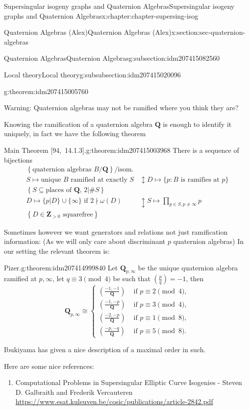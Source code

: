 \documentclass[oneside,10pt,]{book}
\numberwithin{equation}{section}
\newcommand{\legendre}[2]{\left(\frac{#1}{#2}\right)}
\newcommand{\ZZ}{\mathbf{Z}}
\newcommand{\QQ}{\mathbf{Q}}
\newcommand{\gt}{>}
\newcommand{\amp}{&}
\begin{document}
\begin{chapterptx}{Supersingular isogeny graphs and Quaternion Algebras}{}{Supersingular isogeny graphs and Quaternion Algebras}{}{}{x:chapter:chapter-supersing-isog}
\begin{sectionptx}{Quaternion Algebras (Alex)}{}{Quaternion Algebras (Alex)}{}{}{x:section:sec-quaternion-algebras}
\begin{subsectionptx}{Quaternion Algebras}{}{Quaternion Algebras}{}{}{g:subsection:idm207415082560}
\begin{subsubsectionptx}{Local theory}{}{Local theory}{}{}{g:subsubsection:idm207415020096}
\begin{theorem}{}{}{g:theorem:idm207415005760}
\end{theorem}
Warning: Quaternion algebras may not be ramified where you think they are?%
\par
Knowing the ramification of a quaternion algebra \(\QQ\) is enough to identify it uniquely, in fact we have the following theorem%
\begin{theorem}{Main Theorem [94,~14.1.3].}{}{g:theorem:idm207415003968}%
There is a sequence of bijections%
\begin{align*}
\left\{ \text{quaternion algebras }B/\QQ \right\}/\text{isom.}\\
S \mapsto \text{unique }B \text{ ramified at exactly }S\amp\updownarrow D\mapsto \{p : B \text{ is ramifies at } p\}\\
\left\{ S \subseteq \text{places of }\QQ,\,2|\#S \right\}\\
D \mapsto \{p|D\} \cup \{\infty\} \text{ if }2\nmid \omega(D)\amp\updownarrow S \mapsto \prod_{p\in S,p\ne \infty} p\\
\left\{ D\in \ZZ_{\gt 0 }\text{ squarefree}\right\}
\end{align*}
%
\end{theorem}
Sometimes however we want generators and relations not just ramification information: (As we will only care about discriminant \(p\) quaternion algebras) In our setting the relevant theorem is:%
\begin{theorem}{Pizer.}{}{g:theorem:idm207414999840}%
Let \(\QQ_{p,\infty}\) be the unique quaternion algebra ramified at \(p,\infty\), let \(q \equiv 3 \pmod 4\) be such that \(\legendre pq = -1\), then%
\begin{equation*}
\QQ_{p,\infty} \cong
\begin{cases}
\legendre{-1,-1}{\QQ} \amp \text{ if }p\equiv 2\pmod 4,\\
\legendre{-1,-p}{\QQ} \amp \text{ if }p\equiv 3\pmod 4,\\
\legendre{-2,-p}{\QQ} \amp \text{ if }p\equiv 1\pmod 8,\\
\legendre{-p,-q}{\QQ} \amp \text{ if }p\equiv 5\pmod 8.
\end{cases}
\end{equation*}
%
\end{theorem}
Ibukiyama has given a nice description of a maximal order in such.%
\par
Here are some nice references:%
\begin{enumerate}
\item{}Computational Problems in Supersingular Elliptic Curve Isogenies - Steven D. Galbraith and Frederik Vercauteren \url{https://www.esat.kuleuven.be/cosic/publications/article-2842.pdf}%

\end{enumerate}
\end{subsubsectionptx}
\end{subsectionptx}
\end{sectionptx}
\end{chapterptx}
\end{document}
